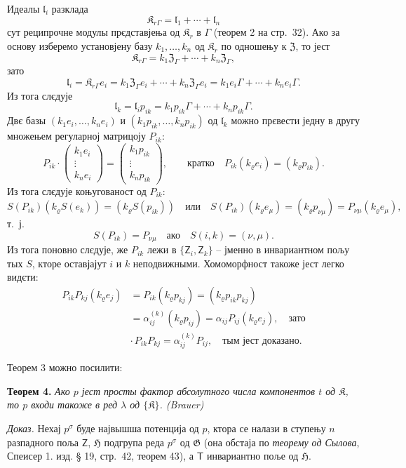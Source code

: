 \documentclass[11pt]{article}
\begin{document}
Идеалы \(\mathfrak l_i\) разклада
\[
\mathfrak K_{r\Gamma}=\mathfrak l_1+\cdots+\mathfrak l_n
\]
сут реципрочне модулы прєдставјења од \(\mathfrak K_r\) в \(\Gamma\) (теорем 2 на стр.~32). Ако за основу изберемо установјену базу \(k_1,\ldots,k_n\) од \(\mathfrak K_r\) по одношењу к \(\mathfrak Z\), то јест
\[
\mathfrak K_{r\Gamma}=k_1\mathfrak Z_\Gamma+\cdots+k_n\mathfrak Z_\Gamma,
\]
зато
\[
\mathfrak l_i=\mathfrak K_{r\Gamma}e_i
=k_1\mathfrak Z_\Gamma e_i+\cdots+k_n\mathfrak Z_\Gamma e_i
=k_1e_i\Gamma+\cdots+k_ne_i\Gamma.
\]
Из тога слєдује
\[
\mathfrak l_k=\mathfrak l_i p_{ik}
=k_1p_{ik}\Gamma+\cdots+k_np_{ik}\Gamma.
\]
Двє базы \((k_1e_i,\ldots,k_ne_i)\) и \((k_1p_{ik},\ldots,k_np_{ik})\) од \(\mathfrak l_k\) можно прєвести једну в другу множењем регуларној матрицоју \(P_{ik}\):
\[
P_{ik}\cdot
\begin{pmatrix}
k_1e_i\\ \vdots\\ k_ne_i
\end{pmatrix}
=
\begin{pmatrix}
k_1p_{ik}\\ \vdots\\ k_np_{ik}
\end{pmatrix},
\qquad
\text{кратко}\quad
P_{ik}(k_\varrho e_i)=(k_\varrho p_{ik}).
\]
Из тога слєдује коњугованост од \(P_{ik}\):
\[
S(P_{ik})(k_\varrho S(e_k))=(k_\varrho S(p_{ik}))
\quad\text{или}\quad
S(P_{ik})(k_\varrho e_\mu)=(k_\varrho p_{\nu\mu})
=P_{\nu\mu}(k_\varrho e_\mu),
\]
т.~ј.
\[
S(P_{ik})=P_{\nu\mu}\quad\text{ако}\quad S(i,k)=(\nu,\mu).
\]
Из тога поновно слєдује, же \(P_{ik}\) лежи в \(\{\mathsf{Z}_i,\mathsf{Z}_k\}\) -- јменно в инвариантном пољу тых \(S\), кторе оставјајут \(i\) и \(k\) неподвижными. Хомоморфност такоже јест легко видєти:
\[
\begin{split}
P_{ik}P_{kj}(k_\varrho e_j)
&=P_{ik}(k_\varrho p_{kj})
=(k_\varrho p_{ik}p_{kj})\\
&=\alpha_{ij}^{(k)}(k_\varrho p_{ij})
=\alpha_{ij}P_{ij}(k_\varrho e_j),
\quad\text{зато}\\
&\cdot\, P_{ik}P_{kj}=\alpha_{ij}^{(k)}P_{ij},
\quad\text{тым јест доказано.}
\end{split}
\]

Теорем 3 можно посилити:

\textbf{Теорем 4.} \emph{Ако \(p\) јест просты фактор абсолутного числа компонентов \(t\) од \(\mathfrak K\), то \(p\) входи такоже в ред \(\lambda\) од \(\{\mathfrak K\}\). (Brauer)}

\emph{Доказ.} Нехај \(p^\sigma\) буде највышша потенција од \(p\), ктора се налази в ступењу \(n\) разпадного поља \(\mathsf{Z}\), \(\mathfrak H\) подгрупа реда \(p^\sigma\) од \(\mathfrak G\) (она обстаја по \emph{теорему од Сылова}, Спеисер 1. изд. § 19, стр.~42, теорем 43), а \(\mathsf{T}\) инвариантно поље од \(\mathfrak H\).
\end{document}
